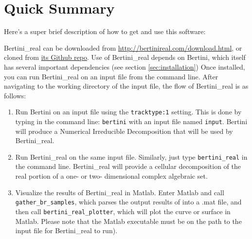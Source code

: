 \section{Quick Summary}
\label{sec:started}

Here's a super brief description of how to get and use this software:

Bertini\_real can be downloaded from \url{http://bertinireal.com/download.html}, or cloned from \href{https://github.com/ofloveandhate/bertini_real}{its Github repo}.  Use of Bertini\_real depends on Bertini, which itself has several important dependencies (see section \ref{sec:installation})
Once installed, you can run Bertini\_real on an input file from the command line. After navigating to the working directory of the input file, the flow of Bertini\_real is as follows:
\begin{enumerate}
\item Run Bertini on an input file using the \texttt{tracktype:1} setting. This is done by typing in the command line: \texttt{bertini} with an input file named \texttt{input}. Bertini will produce a Numerical Irreducible Decomposition that will be used by Bertini\_real.
\item Run Bertini\_real on the same input file. Similarly, just type \texttt{bertini\_real} in the command line. Bertini\_real will provide a cellular decomposition of the real portion of a one- or two- dimensional complex algebraic set.
\item Visualize the results of Bertini\_real in Matlab. Enter Matlab and call \texttt{gather\_br\_samples}, which parses the output results of  into a .mat file, and then call \texttt{bertini\_real\_plotter}, which will plot the curve or surface in Matlab.  Please note that the Matlab executable must be on the path to the input file for Bertini\_real to run). 
\end{enumerate}


